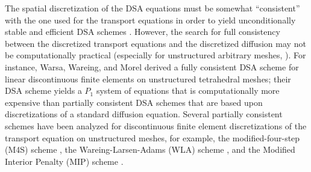 The spatial discretization of the DSA equations
must be somewhat ``consistent'' with the one used for the \sn transport equations 
in order to yield unconditionally stable and efficient DSA schemes
\cite{dsa_ref,larsen_dsa,consistent_p1,m4s,wla,mip}. However, the search for full
consistency between the discretized transport equations and the discretized
diffusion may not be computationally practical (especially for unstructured
arbitrary meshes, \cite{dsa_ref}). For instance, Warsa, Wareing, and
Morel \cite{consistent_p1} derived a fully consistent DSA scheme for linear
discontinuous finite elements on unstructured tetrahedral meshes; their DSA
scheme yields a $P_1$ system of equations that is
computationally more expensive than partially consistent DSA schemes that are
based upon discretizations of a standard diffusion equation. Several partially 
consistent schemes have been analyzed for discontinuous finite element
discretizations of the transport equation on unstructured meshes, for
example, the modified-four-step (M4S) scheme \cite{m4s}, the
Wareing-Larsen-Adams (WLA) scheme \cite{wla}, and the Modified Interior
Penalty (MIP) scheme \cite{mip}.



